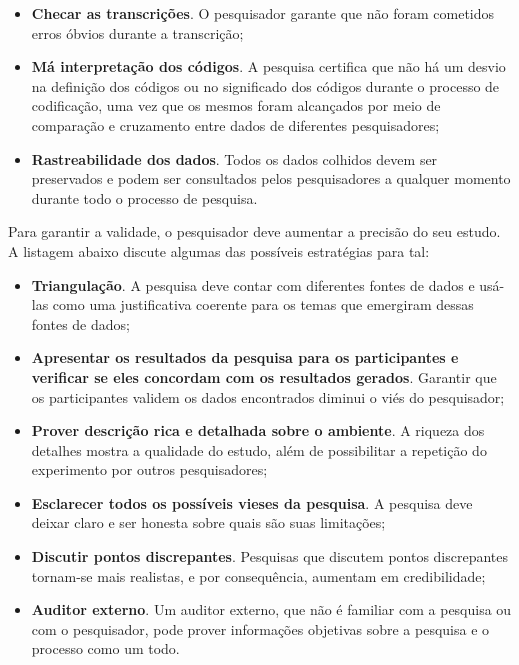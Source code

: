 \begin{itemize}
	\item \textbf{Checar as transcrições}. O pesquisador garante que não foram
	cometidos erros óbvios durante a transcrição;

	\item \textbf{Má interpretação dos códigos}. A pesquisa certifica que não há um
	desvio na definição dos códigos ou no significado dos códigos durante o processo 
	de codificação, uma vez que os mesmos foram alcançados por meio de comparação e
	cruzamento entre dados de diferentes pesquisadores;
	
	\item \textbf{Rastreabilidade dos dados}. Todos os dados colhidos devem ser
	preservados e podem ser consultados pelos pesquisadores a qualquer momento
	durante todo o processo de pesquisa.

\end{itemize}

Para garantir a validade, o pesquisador deve aumentar a precisão do seu estudo.
A listagem abaixo discute algumas das possíveis estratégias para tal:

\begin{itemize}
	\item \textbf{Triangulação}. A pesquisa deve contar com diferentes fontes
	de dados e usá-las como uma justificativa coerente para os temas que emergiram
	dessas fontes de dados;

	\item \textbf{Apresentar os resultados da pesquisa para os participantes e
	verificar se eles concordam com os resultados gerados}. Garantir que os
	participantes validem os dados encontrados diminui o viés do pesquisador;

	\item \textbf{Prover descrição rica e detalhada sobre o ambiente}. A riqueza
	dos detalhes mostra a qualidade do estudo, além de possibilitar a repetição do
	experimento por outros pesquisadores;

	\item \textbf{Esclarecer todos os possíveis vieses da pesquisa}. A pesquisa
	deve deixar claro e ser honesta sobre quais são suas limitações;
	
	\item \textbf{Discutir pontos discrepantes}. Pesquisas que discutem pontos
	discrepantes tornam-se mais realistas, e por consequência, aumentam em
	credibilidade;
	
	\item \textbf{Auditor externo}. Um auditor externo, que não é familiar com a
	pesquisa ou com o pesquisador, pode prover informações objetivas sobre a
	pesquisa e o processo como um todo.

\end{itemize} 

